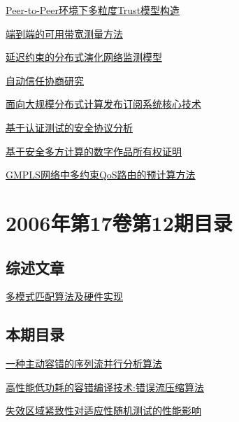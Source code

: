 \documentclass[a4paper]{article}
\begin{document}
\href{http://www.jos.org.cn/ch/reader/download_pdf.aspx?file_no=20060111&year_id=2006&quarter_id=1&falg=1}{Peer-to-Peer环境下多粒度Trust模型构造}

\href{http://www.jos.org.cn/ch/reader/download_pdf.aspx?file_no=20060112&year_id=2006&quarter_id=1&falg=1}{端到端的可用带宽测量方法}

\href{http://www.jos.org.cn/ch/reader/download_pdf.aspx?file_no=20060113&year_id=2006&quarter_id=1&falg=1}{延迟约束的分布式演化网络监测模型}

\href{http://www.jos.org.cn/ch/reader/download_pdf.aspx?file_no=20060114&year_id=2006&quarter_id=1&falg=1}{自动信任协商研究}

\href{http://www.jos.org.cn/ch/reader/download_pdf.aspx?file_no=20060115&year_id=2006&quarter_id=1&falg=1}{面向大规模分布式计算发布订阅系统核心技术}

\href{http://www.jos.org.cn/ch/reader/download_pdf.aspx?file_no=20060116&year_id=2006&quarter_id=1&falg=1}{基于认证测试的安全协议分析}

\href{http://www.jos.org.cn/ch/reader/download_pdf.aspx?file_no=20060117&year_id=2006&quarter_id=1&falg=1}{基于安全多方计算的数字作品所有权证明}

\href{http://www.jos.org.cn/ch/reader/download_pdf.aspx?file_no=20060118&year_id=2006&quarter_id=1&falg=1}{GMPLS网络中多约束QoS路由的预计算方法}


\section{\textbf{2006年第17卷第12期目录}}
\subsection{综述文章}
\href{http://www.jos.org.cn/ch/reader/download_pdf.aspx?file_no=20061201&year_id=2006&quarter_id=12&falg=1}{多模式匹配算法及硬件实现}

\subsection{本期目录}
\href{http://www.jos.org.cn/ch/reader/download_pdf.aspx?file_no=20061202&year_id=2006&quarter_id=12&falg=1}{一种主动容错的序列流并行分析算法}

\href{http://www.jos.org.cn/ch/reader/download_pdf.aspx?file_no=20061203&year_id=2006&quarter_id=12&falg=1}{高性能低功耗的容错编译技术:错误流压缩算法}

\href{http://www.jos.org.cn/ch/reader/download_pdf.aspx?file_no=20061204&year_id=2006&quarter_id=12&falg=1}{失效区域紧致性对适应性随机测试的性能影响}
\end{document}
